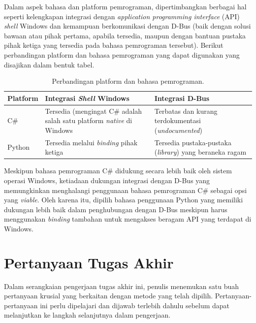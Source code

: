 Dalam aspek bahasa dan platform pemrograman, dipertimbangkan berbagai hal seperti kelengkapan integrasi dengan \textit{application programming interface} (API) \textit{shell} Windows dan kemampuan berkomunikasi dengan D-Bus (baik dengan solusi bawaan atau pihak pertama, apabila tersedia, maupun dengan bantuan pustaka pihak ketiga yang tersedia pada bahasa pemrograman tersebut). Berikut perbandingan platform dan bahasa pemrograman yang dapat digunakan yang disajikan dalam bentuk tabel.

\begin{table}[h]
    \centering
    \caption{Perbandingan platform dan bahasa pemrograman.}
    \begin{tabularx}{\textwidth}{|l|X|X|} \hline
        \textbf{Platform} & \textbf{Integrasi \textit{Shell} Windows} & \textbf{Integrasi D-Bus}\\ \hline
        C\# & Tersedia (mengingat C\# adalah salah satu platform \textit{native} di Windows & Terbatas dan kurang terdokumentasi (\textit{undocumented})\\ \hline
        Python & Tersedia melalui \textit{binding} pihak ketiga & Tersedia pustaka-pustaka (\textit{library}) yang beraneka ragam\\ \hline
    \end{tabularx}
\end{table}

Meskipun bahasa pemrograman C\# didukung secara lebih baik oleh sistem operasi Windows, ketiadaan dukungan integrasi dengan D-Bus yang memungkinkan menghalangi penggunaan bahasa pemrograman C\# sebagai opsi yang \textit{viable}. Oleh karena itu, dipilih bahasa penggunaan Python yang memiliki dukungan lebih baik dalam penghubungan dengan D-Bus meskipun harus menggunakan \textit{binding} tambahan untuk mengakses beragam API yang terdapat di Windows.

\section{Pertanyaan Tugas Akhir}

Dalam serangkaian pengerjaan tugas akhir ini, penulis menemukan satu buah pertanyaan krusial yang berkaitan dengan metode yang telah dipilih. Pertanyaan-pertanyaan ini perlu dipelajari dan dijawab terlebih dahulu sebelum dapat melanjutkan ke langkah selanjutnya dalam pengerjaan.

